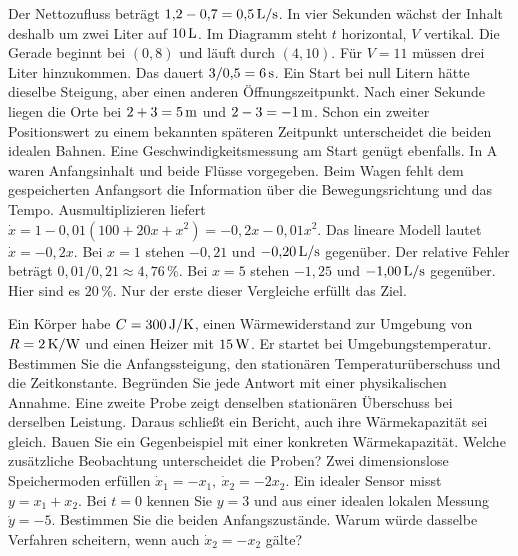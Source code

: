Der Nettozufluss beträgt \(1{,}2-0{,}7=0{,}5\,\mathrm{L/s}\). In vier Sekunden wächst der Inhalt deshalb um zwei Liter auf \(10\,\mathrm{L}\). Im Diagramm steht \(t\) horizontal, \(V\) vertikal. Die Gerade beginnt bei \((0,8)\) und läuft durch \((4,10)\). Für \(V=11\) müssen drei Liter hinzukommen. Das dauert \(3/0{,}5=6\,\mathrm{s}\). Ein Start bei null Litern hätte dieselbe Steigung, aber einen anderen Öffnungszeitpunkt.
Nach einer Sekunde liegen die Orte bei \(2+3=5\,\mathrm{m}\) und \(2-3=-1\,\mathrm{m}\). Schon ein zweiter Positionswert zu einem bekannten späteren Zeitpunkt unterscheidet die beiden idealen Bahnen. Eine Geschwindigkeitsmessung am Start genügt ebenfalls. In A waren Anfangsinhalt und beide Flüsse vorgegeben. Beim Wagen fehlt dem gespeicherten Anfangsort die Information über die Bewegungsrichtung und das Tempo.
Ausmultiplizieren liefert \(\dot x=1-0{,}01(100+20x+x^2)=-0{,}2x-0{,}01x^2\). Das lineare Modell lautet \(\dot x=-0{,}2x\). Bei \(x=1\) stehen \(-0{,}21\) und \(-0{,}20\,\mathrm{L/s}\) gegenüber. Der relative Fehler beträgt \(0{,}01/0{,}21\approx4{,}76\,\%\). Bei \(x=5\) stehen \(-1{,}25\) und \(-1{,}00\,\mathrm{L/s}\) gegenüber. Hier sind es \(20\,\%\). Nur der erste dieser Vergleiche erfüllt das Ziel.



Ein Körper habe \(C=300\,\mathrm{J/K}\), einen Wärmewiderstand zur Umgebung von \(R=2\,\mathrm{K/W}\) und einen Heizer mit \(15\,\mathrm{W}\). Er startet bei Umgebungstemperatur. Bestimmen Sie die Anfangssteigung, den stationären Temperaturüberschuss und die Zeitkonstante. Begründen Sie jede Antwort mit einer physikalischen Annahme.
Eine zweite Probe zeigt denselben stationären Überschuss bei derselben Leistung. Daraus schließt ein Bericht, auch ihre Wärmekapazität sei gleich. Bauen Sie ein Gegenbeispiel mit einer konkreten Wärmekapazität. Welche zusätzliche Beobachtung unterscheidet die Proben?
Zwei dimensionslose Speichermoden erfüllen \(\dot x_1=-x_1,\ \dot x_2=-2x_2\). Ein idealer Sensor misst \(y=x_1+x_2\). Bei \(t=0\) kennen Sie \(y=3\) und aus einer idealen lokalen Messung \(\dot y=-5\). Bestimmen Sie die beiden Anfangszustände. Warum würde dasselbe Verfahren scheitern, wenn auch \(\dot x_2=-x_2\) gälte?

